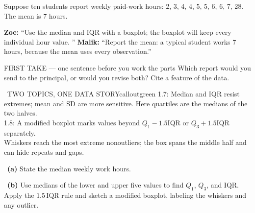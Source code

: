 \documentclass[11pt]{article}
\begin{document}
\clearpage
\normalsize
{}

Suppose ten students report weekly paid-work hours: 2, 3, 4, 4, 5, 5, 6, 6, 7, 28. The mean is 7 hours.\par\smallskip \textbf{Zoe:} ``Use the median and IQR with a boxplot; the boxplot will keep every individual hour value. '' \textbf{Malik:} ``Report the mean: a typical student works 7 hours, because the mean uses every observation.''\par
\begin{center}
\end{center}
\begin{firsttakebox}{FIRST TAKE --- one sentence before you work the parts}
Which report would you send to the principal, or would you revise both? Cite a feature of the data.\par
{}
\end{firsttakebox}

\begin{callout}{\IconBook\ TWO TOPICS, ONE DATA STORY}{calloutgreen}
1.7: Median and IQR resist extremes; mean and SD are more sensitive. Here quartiles are the medians of the two halves.\\ 1.8: A modified boxplot marks values beyond $Q_1-1.5\mathrm{IQR}$ or $Q_3+1.5\mathrm{IQR}$ separately.\\ Whiskers reach the most extreme nonoutliers; the box spans the middle half and can hide repeats and gaps.
\end{callout}

~\textbf{(a)} State the median weekly work hours.\par
{}

~\textbf{(b)} Use medians of the lower and upper five values to find $Q_1$, $Q_3$, and IQR. Apply the $1.5\,\mathrm{IQR}$ rule and sketch a modified boxplot, labeling the whiskers and any outlier.\par
{}
\end{document}
